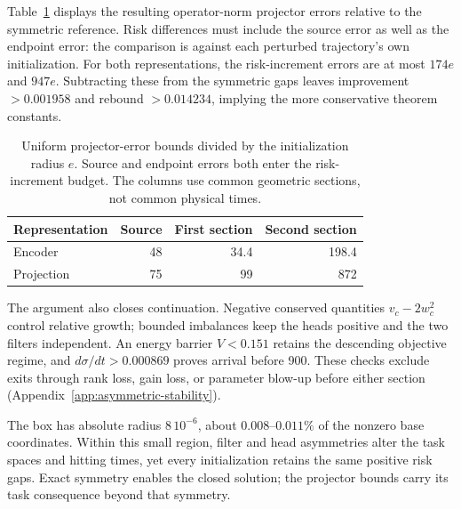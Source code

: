 Table~\ref{tab:asymmetric-budget} displays the resulting operator-norm projector errors relative to the symmetric reference. Risk differences must include the source error as well as the endpoint error: the comparison is against each perturbed trajectory's own initialization. For both representations, the risk-increment errors are at most $174e$ and $947e$. Subtracting these from the symmetric gaps leaves improvement $>0.001958$ and rebound $>0.014234$, implying the more conservative theorem constants.
\begin{table}[t]
\centering\small
\caption{Uniform projector-error bounds divided by the initialization radius $e$. Source and endpoint errors both enter the risk-increment budget. The columns use common geometric sections, not common physical times.}
\label{tab:asymmetric-budget}
\begin{tabular}{lrrr}
\toprule
Representation&Source&First section&Second section\\\midrule
Encoder&48&34.4&198.4\\
Projection&75&99&872\\\bottomrule
\end{tabular}
\end{table}

The argument also closes continuation. Negative conserved quantities $v_c-2w_c^2$ control relative growth; bounded imbalances keep the heads positive and the two filters independent. An energy barrier $V<0.151$ retains the descending objective regime, and $d\sigma/dt>0.000869$ proves arrival before 900. These checks exclude exits through rank loss, gain loss, or parameter blow-up before either section (Appendix~\ref{app:asymmetric-stability}).

The box has absolute radius $8\,10^{-6}$, about $0.008$--$0.011\%$ of the nonzero base coordinates. Within this small region, filter and head asymmetries alter the task spaces and hitting times, yet every initialization retains the same positive risk gaps. Exact symmetry enables the closed solution; the projector bounds carry its task consequence beyond that symmetry.
